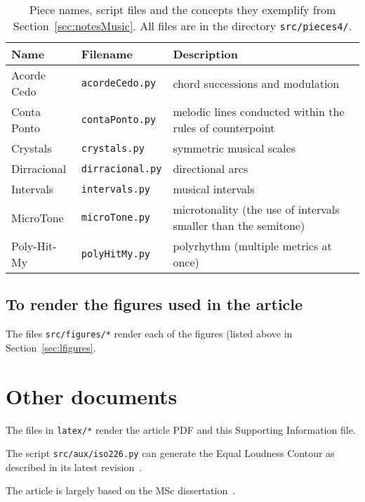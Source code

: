\documentclass{scrreprt}
\begin{document}
\begin{table*}[htp!]
\centering
\caption{Piece names, script files and the concepts they exemplify from Section~\ref{sec:notesMusic}. All files are in the directory \texttt{src/pieces4/}.}
\begin{tabular}{ p{5cm} | p{3.5cm} | p{6.2cm} }
   Name & Filename & Description \\\hline
 Acorde Cedo & \texttt{acordeCedo.py} & chord successions and modulation \\
 Conta Ponto & \texttt{contaPonto.py} & melodic lines conducted within the rules of counterpoint \\
 Crystals & \texttt{crystals.py} & symmetric musical scales \\
 Dirracional & \texttt{dirracional.py} & directional arcs \\
 Intervals & \texttt{intervals.py} & musical intervals \\
 MicroTone & \texttt{microTone.py} & microtonality (the use of intervals smaller than the semitone) \\
 Poly-Hit-My & \texttt{polyHitMy.py} & polyrhythm (multiple metrics at once) \\
\end{tabular}
\end{table*}

\clearpage
\subsection{To render the figures used in the article}
The files \texttt{src/figures/*} render each of the figures (listed above in Section~\ref{sec:lfigures}.

\clearpage
\section{Other documents}
The files in \texttt{latex/*} render the article PDF and this Supporting Information file.

The script \texttt{src/aux/iso226.py} can generate the Equal Loudness Contour as described in its latest revision~\cite{iso226}.

The article is largely based on the MSc dissertation~\cite{dissertacao}.
\end{document}
